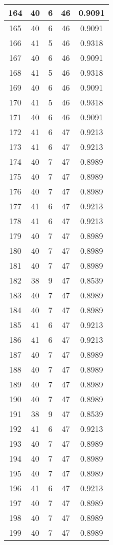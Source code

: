 \documentclass[letterpaper, 12pt]{article}
\begin{document}
\begin{longtable}{|c|c|c|c|c|}
\hline
164 & 40 & 6 & 46 & 0.9091 \\
\hline
165 & 40 & 6 & 46 & 0.9091 \\
\hline
166 & 41 & 5 & 46 & 0.9318 \\
\hline
167 & 40 & 6 & 46 & 0.9091 \\
\hline
168 & 41 & 5 & 46 & 0.9318 \\
\hline
169 & 40 & 6 & 46 & 0.9091 \\
\hline
170 & 41 & 5 & 46 & 0.9318 \\
\hline
171 & 40 & 6 & 46 & 0.9091 \\
\hline
172 & 41 & 6 & 47 & 0.9213 \\
\hline
173 & 41 & 6 & 47 & 0.9213 \\
\hline
174 & 40 & 7 & 47 & 0.8989 \\
\hline
175 & 40 & 7 & 47 & 0.8989 \\
\hline
176 & 40 & 7 & 47 & 0.8989 \\
\hline
177 & 41 & 6 & 47 & 0.9213 \\
\hline
178 & 41 & 6 & 47 & 0.9213 \\
\hline
179 & 40 & 7 & 47 & 0.8989 \\
\hline
180 & 40 & 7 & 47 & 0.8989 \\
\hline
181 & 40 & 7 & 47 & 0.8989 \\
\hline
182 & 38 & 9 & 47 & 0.8539 \\
\hline
183 & 40 & 7 & 47 & 0.8989 \\
\hline
184 & 40 & 7 & 47 & 0.8989 \\
\hline
185 & 41 & 6 & 47 & 0.9213 \\
\hline
186 & 41 & 6 & 47 & 0.9213 \\
\hline
187 & 40 & 7 & 47 & 0.8989 \\
\hline
188 & 40 & 7 & 47 & 0.8989 \\
\hline
189 & 40 & 7 & 47 & 0.8989 \\
\hline
190 & 40 & 7 & 47 & 0.8989 \\
\hline
191 & 38 & 9 & 47 & 0.8539 \\
\hline
192 & 41 & 6 & 47 & 0.9213 \\
\hline
193 & 40 & 7 & 47 & 0.8989 \\
\hline
194 & 40 & 7 & 47 & 0.8989 \\
\hline
195 & 40 & 7 & 47 & 0.8989 \\
\hline
196 & 41 & 6 & 47 & 0.9213 \\
\hline
197 & 40 & 7 & 47 & 0.8989 \\
\hline
198 & 40 & 7 & 47 & 0.8989 \\
\hline
199 & 40 & 7 & 47 & 0.8989 \\
\hline
\end{longtable}
\end{document}
